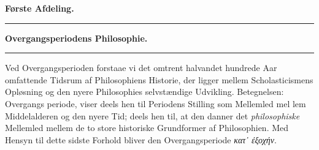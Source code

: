 \documentclass[12pt,a4paper]{book}
\newcommand{\divrule}{\begin{center}\rule{2cm}{0.4pt}\end{center}}
\newcommand{\gk}[1]{\textit{#1}}
\begin{document}
\begin{center}
  \textbf{\large Første Afdeling.}
\end{center}

\divrule

\begin{center}
  \textbf{Overgangsperiodens Philosophie.}
\end{center}

\divrule

Ved Overgangsperioden forstaae vi det omtrent halvandet\-%
hundrede Aar omfattende Tidsrum af Philosophiens Historie,
der ligger mellem Scholasticismens Opløsning og den nyere
Philosophies selvstændige Udvikling. Betegnelsen: Overgangs\-%
periode, viser deels hen til Periodens Stilling som Mellemled mel\-%
lem Middelalderen og den nyere Tid; deels hen til, at den danner
det \emph{philosophiske} Mellemled mellem de to store historiske
Grundformer af Philosophien. Med Hensyn til dette sidste
Forhold bliver den Overgangsperiode \gk{κατ᾽ ἐξοχήν}.
\end{document}
